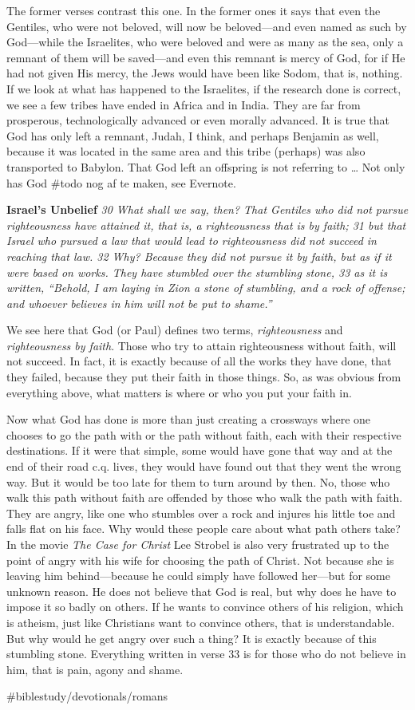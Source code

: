 The former verses contrast this one. In the former ones it says that
even the Gentiles, who were not beloved, will now be beloved---and even
named as such by God---while the Israelites, who were beloved and were
as many as the sea, only a remnant of them will be saved---and even this
remnant is mercy of God, for if He had not given His mercy, the Jews
would have been like Sodom, that is, nothing. If we look at what has
happened to the Israelites, if the research done is correct, we see a
few tribes have ended in Africa and in India. They are far from
prosperous, technologically advanced or even morally advanced. It is
true that God has only left a remnant, Judah, I think, and perhaps
Benjamin as well, because it was located in the same area and this tribe
(perhaps) was also transported to Babylon. That God left an offspring is
not referring to \ldots{} Not only has God \#todo nog af te maken, see
Evernote.

\textbf{Israel's Unbelief} \emph{30 What shall we say, then? That
Gentiles who did not pursue righteousness have attained it, that is, a
righteousness that is by faith; 31 but that Israel who pursued a law
that would lead to righteousness did not succeed in reaching that law.
32 Why? Because they did not pursue it by faith, but as if it were based
on works. They have stumbled over the stumbling stone, 33 as it is
written,} \emph{``Behold, I am laying in Zion a stone of stumbling, and
a rock of offense;\emph{ }and whoever believes in him will not be put to
shame.''}

We see here that God (or Paul) defines two terms, \emph{righteousness}
and \emph{righteousness by faith}. Those who try to attain righteousness
without faith, will not succeed. In fact, it is exactly because of all
the works they have done, that they failed, because they put their faith
in those things. So, as was obvious from everything above, what matters
is where or who you put your faith in.

Now what God has done is more than just creating a crossways where one
chooses to go the path with or the path without faith, each with their
respective destinations. If it were that simple, some would have gone
that way and at the end of their road c.q. lives, they would have found
out that they went the wrong way. But it would be too late for them to
turn around by then. No, those who walk this path without faith are
offended by those who walk the path with faith. They are angry, like one
who stumbles over a rock and injures his little toe and falls flat on
his face. Why would these people care about what path others take? In
the movie \emph{The Case for Christ} Lee Strobel is also very frustrated
up to the point of angry with his wife for choosing the path of Christ.
Not because she is leaving him behind---because he could simply have
followed her---but for some unknown reason. He does not believe that God
is real, but why does he have to impose it so badly on others. If he
wants to convince others of his religion, which is atheism, just like
Christians want to convince others, that is understandable. But why
would he get angry over such a thing? It is exactly because of this
stumbling stone. Everything written in verse 33 is for those who do not
believe in him, that is pain, agony and shame.

\#biblestudy/devotionals/romans
